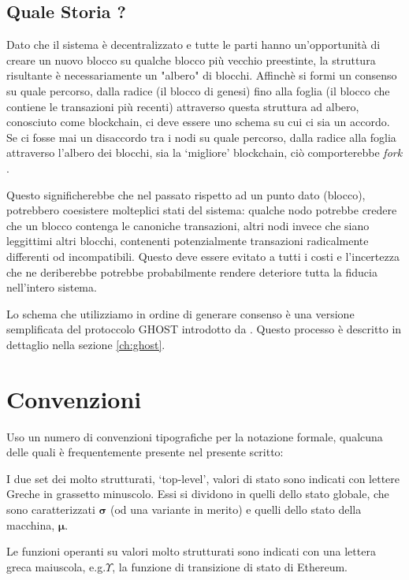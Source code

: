 \documentclass[9pt,oneside]{amsart}
\makeatletter
\newcommand*\eg{e.g.\@\xspace}
\makeatother
\begin{document}
\begin{multicols}{2}
\subsection{Quale Storia ?}

Dato che il sistema è decentralizzato e tutte le parti hanno un'opportunità di creare un nuovo blocco su qualche blocco più vecchio preestinte, la struttura risultante è necessariamente un "albero" di blocchi. Affinchè si formi un consenso su quale percorso, dalla radice (il blocco di genesi) fino alla foglia (il blocco che contiene le transazioni più recenti) attraverso questa struttura ad albero, conosciuto come blockchain, ci deve essere uno schema su cui ci sia un accordo. Se ci fosse mai un disaccordo tra i nodi su quale percorso, dalla radice alla foglia attraverso l'albero dei blocchi, sia la `migliore' blockchain, ciò comporterebbe \textit{fork} .

Questo significherebbe che nel passato rispetto ad un punto dato (blocco), potrebbero coesistere molteplici stati del sistema: qualche nodo potrebbe credere che un blocco contenga le canoniche transazioni, altri nodi invece che siano leggittimi altri blocchi, contenenti potenzialmente transazioni radicalmente differenti od incompatibili. Questo deve essere evitato a tutti i costi e l'incertezza che ne deriberebbe potrebbe probabilmente rendere deteriore tutta la fiducia nell'intero sistema.

Lo schema che utilizziamo in ordine di generare consenso è una versione semplificata del protoccolo GHOST introdotto da \cite{cryptoeprint:2013:881}. Questo processo è descritto in dettaglio nella sezione \ref{ch:ghost}.

\section{Convenzioni}\label{ch:conventions}

Uso un numero di convenzioni tipografiche per la notazione formale, qualcuna delle quali è frequentemente presente nel presente scritto:

I due set dei molto strutturati, `top-level', valori di stato sono indicati con lettere Greche in  grassetto minuscolo. Essi si dividono in quelli dello stato globale, che sono caratterizzati $\boldsymbol{\sigma}$ (od una variante in merito) e quelli dello stato della macchina, $\boldsymbol{\mu}$.

Le funzioni operanti su valori molto strutturati sono indicati con una lettera greca maiuscola, \eg $\Upsilon$, la funzione di transizione di stato di Ethereum.


\end{multicols}
\end{document}
